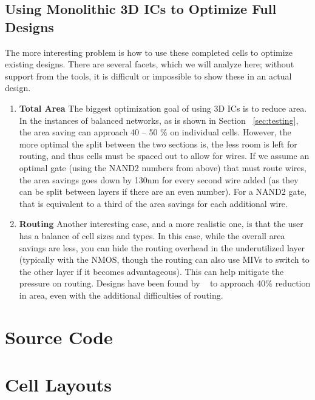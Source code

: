 \documentclass{article}
\begin{document}
\subsection{Using Monolithic 3D ICs to Optimize Full Designs} The more interesting problem is how to use these completed cells to optimize existing designs. There are several facets, which we will analyze here; without support from the tools, it is difficult or impossible to show these in an actual design. 
\begin{enumerate}
	\item \textbf{Total Area} The biggest optimization goal of using 3D ICs is to reduce area. In the instances of balanced networks, as is shown in Section ~\ref{sec:testing}, the area saving can approach 40 -- 50 \% on individual cells. However, the more optimal the split between the two sections is, the less room is left for routing, and thus cells must be spaced out to allow for wires. If we assume an optimal gate (using the NAND2 numbers from above) that must route wires, the area savings goes down by 130nm for every second wire added (as they can be split between layers if there are an even number). For a NAND2 gate, that is equivalent to a third of the area savings for each additional wire. 
	\item \textbf{Routing} Another interesting case, and a more realistic one, is that the user has a balance of cell sizes and types. In this case, while the overall area savings are less, you can hide the routing overhead in the underutilized layer (typically with the NMOS, though the routing can also use MIVs to switch to the other layer if it becomes advantageous). This can help mitigate the pressure on routing. Designs have been found by ~\cite{ULTRA} to approach 40\% reduction in area, even with the additional difficulties of routing. 

\end{enumerate}

\newpage
\appendix 
\section{Source Code}

\clearpage
\section{Cell Layouts} 
\end{document}
